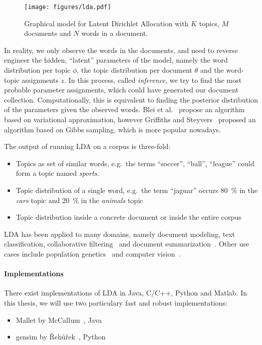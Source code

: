 \documentclass{sig-alternate-05-2015}
\begin{document}
\begin{figure}
       \centering
       \texttt{[image: figures/lda.pdf]}
       \caption{Graphical model for Latent Dirichlet Allocation with $K$ topics, $M$ documents and $N$ words in a document.}
       \label{fig:lda}
\end{figure}

In reality, we only observe the words in the documents, and need to reverse engineer the hidden, ``latent'' parameters of the model, namely the word distribution per topic $\phi$, the topic distribution per document $\theta$ and the word-topic assignments $z$.
In this process, called \emph{inference}, we try to find the most probable parameter assignments, which could have generated our document collection.
Computationally, this is equivalent to finding the posterior distribution of the parameters given the observed words.
Blei et al.~\cite{Blei2003} propose an algorithm based on variational approximation, however Griffiths and Steyvers~\cite{Griffiths2004} proposed an algorithm based on Gibbs sampling, which is more popular nowadays.

The output of running LDA on a corpus is three-fold:
\begin{itemize}
       \item Topics as set of similar words, e.g.\ the terms ``soccer'', ``ball'', ``league'' could form a topic named \emph{sports}.
       \item Topic distribution of a single word, e.g.\ the term ``jaguar'' occurs 80~\% in the \emph{cars} topic and 20~\% in the \emph{animals} topic
       \item Topic distribution inside a concrete document or inside the entire corpus
\end{itemize}

LDA has been applied to many domains, namely document modeling, text classification, collaborative filtering~\cite{Blei2003} and document summarization~\cite{Wang2009}.
Other use cases include population genetics~\cite{Pritchard2000} and computer vision~\cite{LiFei-Fei2005}.

\paragraph{Implementations}
There exist implementations of LDA in Java, C/C++, Python and Matlab.
In this thesis, we will use two particulary fast and robust implementations:
\begin{itemize}
       \item Mallet by McCallum~\cite{McCallum2002}, Java
       \item gensim by {\v R}eh{\r u}{\v r}ek~\cite{Rehurek2010}, Python
\end{itemize}
\end{document}

